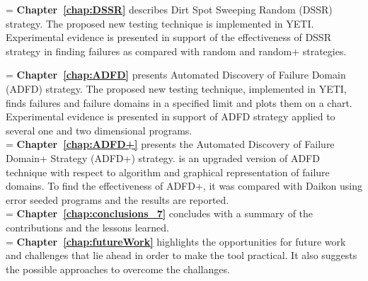 \hangindent=\parindent
{}
\noindent
\textbf{Chapter~\ref{chap:DSSR}} describes Dirt Spot Sweeping Random (DSSR) strategy. The proposed new testing technique is implemented in YETI. Experimental evidence is presented in support of the effectiveness of DSSR strategy in finding failures as compared with random and random+ strategies. 

\hangindent=\parindent
{}
\noindent
\textbf{Chapter~\ref{chap:ADFD}} presents Automated Discovery of Failure Domain (ADFD) strategy. The proposed new testing technique, implemented in YETI, finds failures and failure domains in a specified limit and plots them on a chart. Experimental evidence is presented in support of ADFD strategy applied to several one and two dimensional programs. \\

 
\hangindent=\parindent
{}
\noindent
\textbf{Chapter~\ref{chap:ADFD+}} presents the Automated Discovery of Failure Domain+ Strategy (ADFD+) strategy. is an upgraded version of ADFD technique with respect to algorithm and graphical representation of failure domains. To find the effectiveness of ADFD+, it was compared with Daikon using error seeded programs and the results are reported.\\ 



\hangindent=\parindent
{}
\noindent
\textbf{Chapter~\ref{chap:conclusions_7}} concludes with a summary of the contributions and the lessons learned.\\

\hangindent=\parindent
{}
\noindent
\textbf{Chapter~\ref{chap:futureWork}} highlights the opportunities for future work and challenges that lie ahead in order to make the tool practical. It also suggests the possible approaches to overcome the challanges.\\


